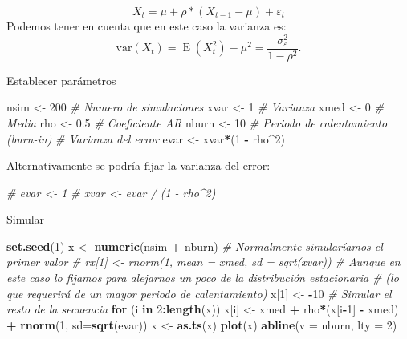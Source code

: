 \documentclass[]{book}
\newenvironment{Shaded}{\begin{snugshade}}{\end{snugshade}}
\newcommand{\KeywordTok}[1]{\textcolor[rgb]{0.13,0.29,0.53}{\textbf{#1}}}
\newcommand{\DataTypeTok}[1]{\textcolor[rgb]{0.13,0.29,0.53}{#1}}
\newcommand{\DecValTok}[1]{\textcolor[rgb]{0.00,0.00,0.81}{#1}}
\newcommand{\FloatTok}[1]{\textcolor[rgb]{0.00,0.00,0.81}{#1}}
\newcommand{\StringTok}[1]{\textcolor[rgb]{0.31,0.60,0.02}{#1}}
\newcommand{\CommentTok}[1]{\textcolor[rgb]{0.56,0.35,0.01}{\textit{#1}}}
\newcommand{\ControlFlowTok}[1]{\textcolor[rgb]{0.13,0.29,0.53}{\textbf{#1}}}
\newcommand{\OperatorTok}[1]{\textcolor[rgb]{0.81,0.36,0.00}{\textbf{#1}}}
\newcommand{\NormalTok}[1]{#1}
\theoremstyle{definition}
\theoremstyle{definition}
\theoremstyle{definition}
\theoremstyle{remark}
\begin{document}
\[X_t = \mu + \rho * (X_{t-1} - \mu) + \varepsilon_t\] Podemos tener en
cuenta que en este caso la varianza es:
\[\textrm{var}(X_t)=\operatorname{E}(X_t^2)-\mu^2=\frac{\sigma_\varepsilon^2}{1-\rho^2}.\]

Establecer parámetros

\begin{Shaded}
\begin{Highlighting}[]
\NormalTok{nsim <-}\StringTok{ }\DecValTok{200}   \CommentTok{# Numero de simulaciones}
\NormalTok{xvar <-}\StringTok{ }\DecValTok{1}     \CommentTok{# Varianza}
\NormalTok{xmed <-}\StringTok{ }\DecValTok{0}     \CommentTok{# Media}
\NormalTok{rho <-}\StringTok{ }\FloatTok{0.5}    \CommentTok{# Coeficiente AR}
\NormalTok{nburn <-}\StringTok{ }\DecValTok{10}   \CommentTok{# Periodo de calentamiento (burn-in)}
\CommentTok{# Varianza del error}
\NormalTok{evar <-}\StringTok{ }\NormalTok{xvar}\OperatorTok{*}\NormalTok{(}\DecValTok{1} \OperatorTok{-}\StringTok{ }\NormalTok{rho}\OperatorTok{^}\DecValTok{2}\NormalTok{)}
\end{Highlighting}
\end{Shaded}

Alternativamente se podría fijar la varianza del error:

\begin{Shaded}
\begin{Highlighting}[]
\CommentTok{#   evar <- 1     }
\CommentTok{#   xvar <- evar / (1 - rho^2)}
\end{Highlighting}
\end{Shaded}

Simular

\begin{Shaded}
\begin{Highlighting}[]
\KeywordTok{set.seed}\NormalTok{(}\DecValTok{1}\NormalTok{)}
\NormalTok{x <-}\StringTok{ }\KeywordTok{numeric}\NormalTok{(nsim }\OperatorTok{+}\StringTok{ }\NormalTok{nburn)}
\CommentTok{# Normalmente simularíamos el primer valor}
\CommentTok{#   rx[1] <- rnorm(1, mean = xmed, sd = sqrt(xvar))}
\CommentTok{# Aunque en este caso lo fijamos para alejarnos un poco de la distribución estacionaria}
\CommentTok{# (lo que requerirá de un mayor periodo de calentamiento)}
\NormalTok{x[}\DecValTok{1}\NormalTok{] <-}\StringTok{ }\OperatorTok{-}\DecValTok{10}
\CommentTok{# Simular el resto de la secuencia}
\ControlFlowTok{for}\NormalTok{ (i }\ControlFlowTok{in} \DecValTok{2}\OperatorTok{:}\KeywordTok{length}\NormalTok{(x))}
\NormalTok{  x[i] <-}\StringTok{ }\NormalTok{xmed }\OperatorTok{+}\StringTok{ }\NormalTok{rho}\OperatorTok{*}\NormalTok{(x[i}\OperatorTok{-}\DecValTok{1}\NormalTok{] }\OperatorTok{-}\StringTok{ }\NormalTok{xmed) }\OperatorTok{+}\StringTok{ }\KeywordTok{rnorm}\NormalTok{(}\DecValTok{1}\NormalTok{, }\DataTypeTok{sd=}\KeywordTok{sqrt}\NormalTok{(evar))}
\NormalTok{x <-}\StringTok{ }\KeywordTok{as.ts}\NormalTok{(x)}
\KeywordTok{plot}\NormalTok{(x)}
\KeywordTok{abline}\NormalTok{(}\DataTypeTok{v =}\NormalTok{ nburn, }\DataTypeTok{lty =} \DecValTok{2}\NormalTok{)}
\end{Highlighting}
\end{Shaded}
\end{document}
